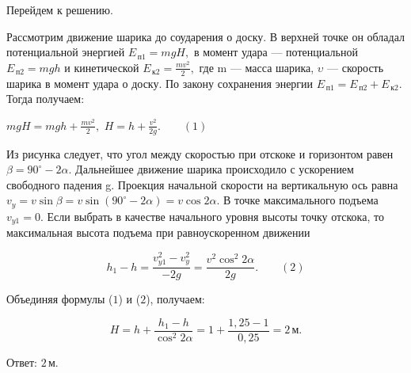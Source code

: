 \documentclass[12pt,a4paper]{article}
\begin{document}
{Перейдем к решению. \begin{center}\end{center}
Рассмотрим движение шарика до соударения о доску. В верхней точке он обладал потенциальной энергией $E_{\,\text{п}1}= mgH,$ в момент удара  — потенциальной $E_{\,\text{п}2}= mgh$ и кинетической $E_{\,\text{к}2}= \frac{m v ^2}{2} ,$ где m  — масса шарика, \ensuremath{\upsilon}  — скорость шарика в момент удара о доску. По закону сохранения энергии $E_{\,\text{п}1}=E_{\,\text{п}2} + E_{\,\text{к}2}.$ Тогда получаем:

$mgH=mgh + \frac{m v ^2}{2} ,$
$H=h + \frac{v ^2}{2g} . \qquad ( 1 )$

Из рисунка следует, что угол между скоростью при отскоке и горизонтом равен $\beta =90 ^\circ - 2 \alpha .$
Дальнейшее движение шарика происходило с ускорением свободного падения g. Проекция начальной скорости на вертикальную ось равна $v _y= v \sin \beta = v \sin ( 90 ^\circ - 2 \alpha ) = v \cos 2 \alpha .$ В точке максимального подъема $v_{y1}=0.$ Если выбрать в качестве начального уровня высоты точку отскока, то максимальная высота подъема при равноускоренном движении

\[h_1 - h= \frac{v_{y1} ^2 - v _y ^2}{- 2g} = \frac{v ^2 \cos ^2 2 \alpha}{2g} . \qquad ( 2 )\]

Объединяя формулы ($1$) и ($2$), получаем:

\[H=h + \frac{h_1 - h}{\cos ^2 2 \alpha} =1 + \frac{1{,}25 - 1}{0{,}25} =2\,\text{м}.\]

Ответ: $2\,\text{м}$.
}
\end{document}
